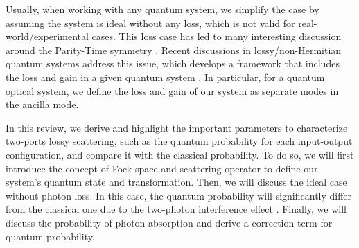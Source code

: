 \documentclass[%
 aps,
 reprint,
 twocolumn,
 amsmath,amssymb,
floatfix,
]{revtex4-2}
\begin{document}
Usually, when working with any quantum system, we simplify the case by assuming the system is ideal without any loss, which is not valid for real-world/experimental cases. This loss case has led to many interesting discussion around the Parity-Time symmetry \cite{minganti_quantum_2019,arkhipov_liouvillian_2020}. Recent discussions in lossy/non-Hermitian quantum systems address this issue, which develops a framework that includes the loss and gain in a given quantum system \cite{leonhardt_quantum_2003, wong_quantum_2022}. In particular, for a quantum optical system, we define the loss and gain of our system as separate modes in the ancilla mode.

In this review, we derive and highlight the important parameters to characterize two-ports lossy scattering, such as the quantum probability for each input-output configuration, and compare it with the classical probability. To do so, we will first introduce the concept of Fock space and scattering operator to define our system's quantum state and transformation. Then, we will discuss the ideal case without photon loss. In this case, the quantum probability will significantly differ from the classical one due to the two-photon interference effect \cite{hong_measurement_1987}. Finally, we will discuss the probability of photon absorption and derive a correction term for quantum probability.
\end{document}
